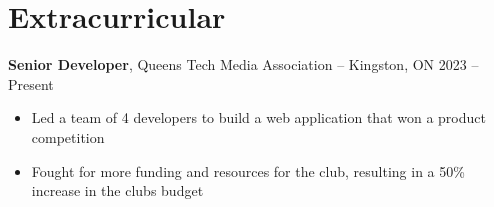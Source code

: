 

\section*{Extracurricular}
\textbf{Senior Developer}, {Queen\textquotesingle s Tech Media Association} -- Kingston, ON \hfill 2023 -- Present \\
\vspace{-9pt}
\begin{itemize}
  \item Led a team of 4 developers to build a web application that won a product competition
  \item Fought for more funding and resources for the club, resulting in a 50\% increase in the club\textquotesingle s budget
\end{itemize}


